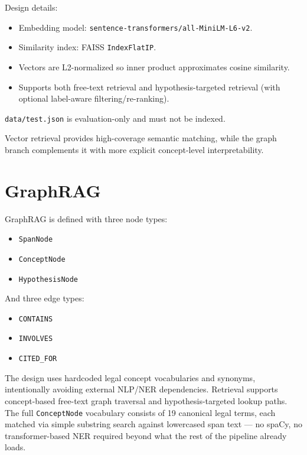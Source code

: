 \documentclass[11pt]{article}
\begin{document}
Design details:
\begin{itemize}
  \item Embedding model: \texttt{sentence-transformers/all-MiniLM-L6-v2}.
  \item Similarity index: FAISS \texttt{IndexFlatIP}.
  \item Vectors are L2-normalized so inner product approximates cosine similarity.
  \item Supports both free-text retrieval and hypothesis-targeted retrieval (with optional label-aware filtering/re-ranking).
\end{itemize}

\texttt{data/test.json} is evaluation-only and must not be indexed.

Vector retrieval provides high-coverage semantic matching, while the graph branch complements it with more explicit concept-level interpretability.

\section{GraphRAG}
GraphRAG is defined with three node types:
\begin{itemize}
  \item \texttt{SpanNode}
  \item \texttt{ConceptNode}
  \item \texttt{HypothesisNode}
\end{itemize}

And three edge types:
\begin{itemize}
  \item \texttt{CONTAINS}
  \item \texttt{INVOLVES}
  \item \texttt{CITED\_FOR}
\end{itemize}

The design uses hardcoded legal concept vocabularies and synonyms, intentionally avoiding external NLP/NER dependencies. Retrieval supports concept-based free-text graph traversal and hypothesis-targeted lookup paths. The full \texttt{ConceptNode} vocabulary consists of 19 canonical legal terms, each matched via simple substring search against lowercased span text — no spaCy, no transformer-based NER required beyond what the rest of the pipeline already loads.
\end{document}
